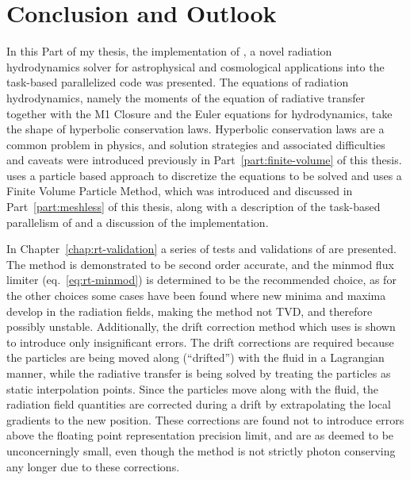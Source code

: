\chapter{Conclusion and Outlook}

In this Part of my thesis, the implementation of \GEARRT, a novel radiation hydrodynamics solver for
astrophysical and cosmological applications into the task-based parallelized code \swift was
presented. The equations of radiation hydrodynamics, namely the moments of the equation of radiative
transfer together with the M1 Closure and the Euler equations for hydrodynamics, take the shape of
hyperbolic conservation laws. Hyperbolic conservation laws are a common problem in physics, and
solution strategies and associated difficulties and caveats were introduced previously in
Part~\ref{part:finite-volume} of this thesis. \GEARRT uses a particle based approach to discretize
the equations to be solved and uses a Finite Volume Particle Method, which was introduced and
discussed in Part~\ref{part:meshless} of this thesis, along with a description of the task-based
parallelism of \swift and a discussion of the implementation.


In Chapter~\ref{chap:rt-validation} a series of tests and validations of \GEARRT are presented. The
method is demonstrated to be second order accurate, and the minmod flux limiter
(eq.~\ref{eq:rt-minmod}) is determined to be the recommended choice, as for the other choices some
cases have been found where new minima and maxima develop in the radiation fields, making the method
not TVD, and therefore possibly unstable. Additionally, the drift correction method which \GEARRT
uses is shown to introduce only insignificant errors. The drift corrections are required because the
particles are being moved along (``drifted'') with the fluid in a Lagrangian manner, while the
radiative transfer is being solved by treating the particles as static interpolation points. Since
the particles move along with the fluid, the radiation field quantities are corrected during a drift
by extrapolating the local gradients to the new position. These corrections are found not to
introduce errors above the floating point representation precision limit, and are as deemed to be unconcerningly small, even
though the method is not strictly photon conserving any longer due to these corrections.

